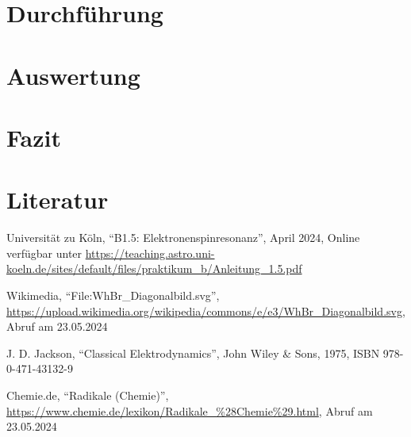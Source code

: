 \documentclass[12pt,a4paper]{scrartcl}
\numberwithin{equation}{section} %
\begin{document}
\clearpage
\hypertarget{durchfuxfchrung}{%
\section{Durchführung}\label{durchfuxfchrung}}

\clearpage
\hypertarget{auswertung}{%
\section{Auswertung}\label{auswertung}}

\clearpage
\hypertarget{fazit}{%
\section{Fazit}\label{fazit}}

\clearpage
\hypertarget{literatur}{%
\section{Literatur}\label{literatur}}
\renewcommand{\section}[2]{}

\begin{thebibliography}{99}
	Universität zu Köln, ``B1.5: Elektronenspinresonanz'', April 2024, Online verfügbar unter 
	\url{https://teaching.astro.uni-koeln.de/sites/default/files/praktikum_b/Anleitung_1.5.pdf}

	Wikimedia, ``File:WhBr\_Diagonalbild.svg'',
	\url{https://upload.wikimedia.org/wikipedia/commons/e/e3/WhBr_Diagonalbild.svg},
	Abruf am 23.05.2024

	J. D. Jackson, ``Classical Elektrodynamics'', John Wiley \& Sons,
	1975, ISBN 978-0-471-43132-9

	Chemie.de, ``Radikale (Chemie)'',
	\url{https://www.chemie.de/lexikon/Radikale_\%28Chemie\%29.html}, Abruf am 23.05.2024

\end{thebibliography}
\end{document}
